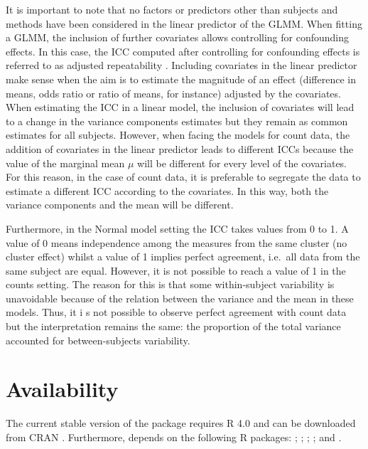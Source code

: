 It is important to note that no factors or predictors other than
subjects and methods have been considered in the linear predictor of the
GLMM. When fitting a GLMM, the inclusion of further covariates allows
controlling for confounding effects. In this case, the ICC computed
after controlling for confounding effects is referred to as adjusted
repeatability \citep{nakagawa2010}. Including covariates in the linear
predictor make sense when the aim is to estimate the magnitude of an
effect (difference in means, odds ratio or ratio of means, for instance)
adjusted by the covariates. When estimating the ICC in a linear model,
the inclusion of covariates will lead to a change in the variance
components estimates but they remain as common estimates for all
subjects. However, when facing the models for count data, the addition
of covariates in the linear predictor leads to different ICCs because
the value of the marginal mean \(\mu\) will be different for every level
of the covariates. For this reason, in the case of count data, it is
preferable to segregate the data to estimate a different ICC according
to the covariates. In this way, both the variance components and the
mean will be different.

Furthermore, in the Normal model setting the ICC takes values from 0 to
1. A value of 0 means independence among the measures from the same
cluster (no cluster effect) whilst a value of 1 implies perfect
agreement, i.e.~all data from the same subject are equal. However, it is
not possible to reach a value of 1 in the counts setting. The reason for
this is that some within-subject variability is unavoidable because of
the relation between the variance and the mean in these models. Thus, it
i s not possible to observe perfect agreement with count data but the
interpretation remains the same: the proportion of the total variance
accounted for between-subjects variability.

\hypertarget{availability}{%
\section{Availability}\label{availability}}

The current stable version of the package requires R 4.0 and can be
downloaded from CRAN
\href{https://cran.r-project.org/web/packages/iccCounts/}{}.
Furthermore,  depends on the following R packages:
 \citep{brooks2017}; 
\citep{Wickham2016};  \citep{Clausen2020};
 \citep{Auguie2017}; and 
\citep{Wickham2020}.


